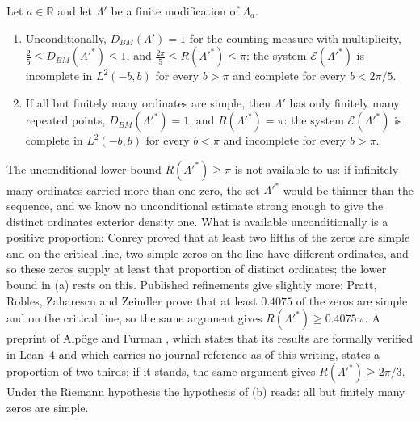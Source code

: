 \documentclass[11pt]{article}
\newcommand{\R}{\mathbb{R}}
\newcommand{\Lam}{\Lambda}
\newcommand{\E}{\mathcal{E}}
\begin{document}
\begin{theorem}\label{thm:BM}
Let $a\in\R$ and let $\Lam'$ be a finite modification of $\Lam_a$.
\begin{enumerate}
\item[(a)] Unconditionally, $D_{BM}(\Lam')=1$ for the counting measure with multiplicity, $\frac25\le D_{BM}(\Lam'^\ast)\le1$, and $\frac{2\pi}5\le R(\Lam'^\ast)\le\pi$: the system $\E(\Lam'^\ast)$ is incomplete in $L^2(-b,b)$ for every $b>\pi$ and complete for every $b<2\pi/5$.
\item[(b)] If all but finitely many ordinates are simple, then $\Lam'$ has only finitely many repeated points, $D_{BM}(\Lam'^\ast)=1$, and $R(\Lam'^\ast)=\pi$: the system $\E(\Lam'^\ast)$ is complete in $L^2(-b,b)$ for every $b<\pi$ and incomplete for every $b>\pi$.
\end{enumerate}
\end{theorem}

The unconditional lower bound $R(\Lam'^\ast)\ge\pi$ is not available to us: if infinitely many ordinates carried more than one zero, the set $\Lam'^\ast$ would be thinner than the sequence, and we know no unconditional estimate strong enough to give the distinct ordinates exterior density one. What is available unconditionally is a positive proportion: Conrey \cite{Conrey89} proved that at least two fifths of the zeros are simple and on the critical line, two simple zeros on the line have different ordinates, and so these zeros supply at least that proportion of distinct ordinates; the lower bound in (a) rests on this. Published refinements give slightly more: Pratt, Robles, Zaharescu and Zeindler \cite{PRZZ} prove that at least $0.4075$ of the zeros are simple and on the critical line, so the same argument gives $R(\Lam'^\ast)\ge0.4075\,\pi$. A preprint of Alp\"oge and Furman \cite{AlpogeFurman}, which states that its results are formally verified in Lean~4 and which carries no journal reference as of this writing, states a proportion of two thirds; if it stands, the same argument gives $R(\Lam'^\ast)\ge2\pi/3$. Under the Riemann hypothesis the hypothesis of (b) reads: all but finitely many zeros are simple.
\end{document}
